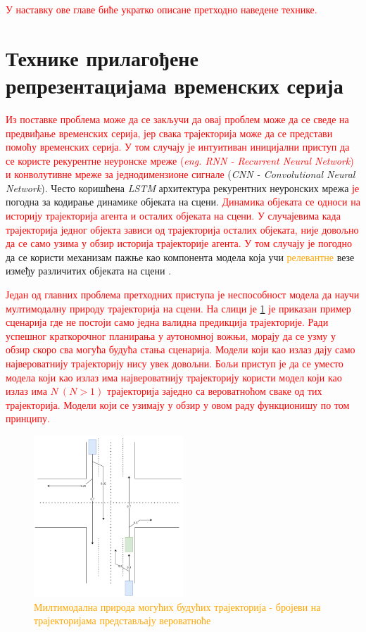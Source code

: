\documentclass[11pt,oneside]{memoir}
\begin{document}
\textcolor{red}{У наставку ове главе биће укратко описане претходно наведене технике.}

\section{Технике прилагођене репрезентацијама временских серија}

\textcolor{red}{Из поставке проблема може да се закључи да овај проблем може да се сведе на предвиђање временских серија, јер свака 
трајекторија може да се представи помоћу временских серија. У том случају је интуитиван иницијални приступ да се користе рекурентне неуронске мреже 
(\textit{eng. RNN - Recurrent Neural Network}) и конволутивне мреже за једнодимензионе сигнале} (\textit{CNN - Convolutional Neural Network}). 
Често коришћена \textit{LSTM} архитектура рекурентних неуронских мрежа \textcolor{red}{је} погодна за кодирање динамике објеката на сцени. 
\textcolor{red}{Динамика објеката се односи на историју трајекторија агента и осталих објеката на сцени.} 
\textcolor{red}{У случајевима када трајекторија једног објекта зависи од трајекторија осталих објеката, није довољно да се само узима у обзир
историја трајекторије агента. У том случају је погодно} да се користи механизам пажње као компонента модела која учи 
\textcolor{orange}{релевантне} везе између различитих објеката на сцени \cite{argoverse, social_lstm, attention_is_all_you_need}. 

\textcolor{red}{Један од главних проблема претходних приступа је неспособност модела да научи мултимодалну природу трајекторија на сцени. На слици
је \ref{multimodal-example} је приказан пример сценарија где не постоји само једна валидна предикција трајекторије. 
Ради успешног краткорочног планирања у аутономној вожњи, морају да се узму у обзир скоро сва могућа будућа стања сценарија. Модели
који као излаз дају само највероватнију трајекторију нису увек довољни. Бољи приступ је да се уместо модела који као излаз има највероватнију трајекторију користи
модел који као излаз има $N\ (N > 1)$ трајекторија заједно са вероватноћом сваке од тих трајекторија. Модели који се узимају у обзир у овом раду функционишу
по том принципу. }

\begin{figure}[H]
  \centering
  \includegraphics[width=0.5\textwidth]{images/multimodal.drawio.png}
  \caption{\textcolor{orange}{Милтимодална природа могућих будућих трајекторија - бројеви на трајекторијама представљају вероватноће}}
  \label{multimodal-example}
\end{figure}
\end{document}
